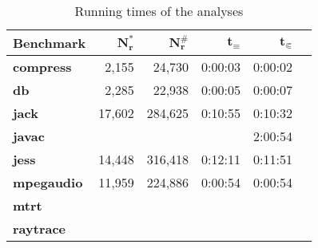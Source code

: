 \begin{table}[h]
\caption{Running times of the analyses}\label{tab:runtimes}
\centering
\setlength{\tabcolsep}{2ex}
\begin{tabular}{lrrrrr}
\toprule
\textbf{Benchmark}   & $\bm{N^*_r}$ & $\bm{N^\#_r}$ & $\bm{t_\equiv}$ & $\bm{t_{\Subset}}$ \\ \midrule
\textbf{compress}    & 2,155        & 24,730        & 0:00:03         & 0:00:02            \\
\textbf{db}          & 2,285        & 22,938        & 0:00:05         & 0:00:07            \\
\textbf{jack}        & 17,602       & 284,625       & 0:10:55         & 0:10:32            \\
\textbf{javac}       &              &               &                 & 2:00:54            \\
\textbf{jess}        & 14,448       & 316,418       & 0:12:11         & 0:11:51            \\
\textbf{mpegaudio}   & 11,959       & 224,886       & 0:00:54         & 0:00:54            \\
\textbf{mtrt}        &              &               &                 &                    \\
\textbf{raytrace}    &              &               &                 &                    \\ \bottomrule
\end{tabular}
\end{table}
